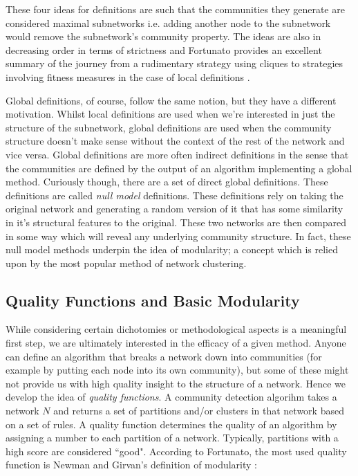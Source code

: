These four ideas for definitions are such that the communities they generate are considered maximal subnetworks i.e. adding another node to the subnetwork would remove the subnetwork's community property. The ideas are also in decreasing order in terms of strictness and Fortunato provides an excellent summary of the journey from a rudimentary strategy using cliques to strategies involving fitness measures in the case of local definitions \cite[p. 88-90]{fortunato}.

Global definitions, of course, follow the same notion, but they have a different motivation. Whilst local definitions are used when we're interested in just the structure of the subnetwork, global definitions are used when the community structure doesn't make sense without the context of the rest of the network and vice versa. Global definitions are more often indirect definitions in the sense that the communities are defined by the output of an algorithm implementing a global method. Curiously though, there are a set of direct global definitions. These definitions are called \emph{null model} definitions. These definitions rely on taking the original network and generating a random version of it that has some similarity in it's structural features to the original. These two networks are then compared in some way which will reveal any underlying community structure. In fact, these null model methods underpin the idea of modularity; a concept which is relied upon by the most popular method of network clustering.

\subsection{Quality Functions and Basic Modularity}\label{sec:qfs and modularity}

While considering certain dichotomies or methodological aspects is a meaningful first step, we are ultimately interested in the efficacy of a given method. Anyone can define an algorithm that breaks a network down into communities (for example by putting each node into its own community), but some of these might not provide us with high quality insight to the structure of a network. Hence we develop the idea of \emph{quality functions}. A community detection algorihm takes a network $N$ and returns a set of partitions and/or clusters in that network based on a set of rules. A quality function determines the quality of an algorithm by assigning a number to each partition of a network. Typically, partitions with a high score are considered ``good". According to Fortunato, the most used quality function is Newman and Girvan's definition of modularity \cite[p. 8]{newman_girvan}:

